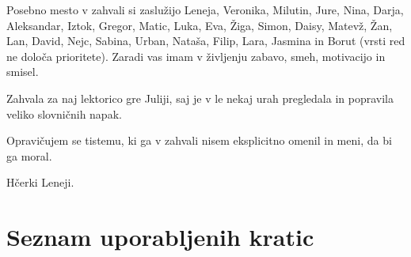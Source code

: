 \documentclass[a4paper, 12pt]{book}
\newcommand{\clearemptydoublepage}{\newpage{\pagestyle{empty}\cleardoublepage}}
\begin{document}
Posebno mesto v zahvali si zaslužijo Leneja, Veronika, Milutin, Jure, Nina, Darja, Aleksandar, Iztok, Gregor, Matic, Luka, Eva, Žiga, Simon, Daisy, Matevž, Žan, Lan, David, Nejc, Sabina, Urban, Nataša, Filip, Lara, Jasmina in Borut (vrsti red ne določa prioritete). Zaradi vas imam v življenju zabavo, smeh, motivacijo in smisel.

Zahvala za naj lektorico gre Juliji, saj je v le nekaj urah pregledala in popravila veliko slovničnih napak.

Opravičujem se tistemu, ki ga v zahvali nisem eksplicitno omenil in meni, da bi ga moral.
\rm\normalfont

\clearemptydoublepage

\thispagestyle{empty}\mbox{}{\textheight}\mbox{}\hfill\begin{minipage}{0.55\textwidth}%
Hčerki Leneji.
\normalfont\end{minipage}

\clearemptydoublepage

\def\thepage{}%
\tableofcontents{}


\clearemptydoublepage


\chapter*{Seznam uporabljenih kratic}
\end{document}

